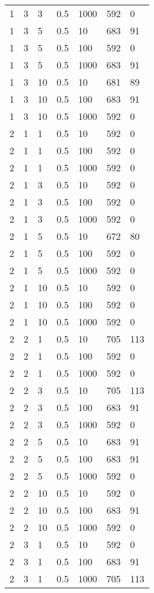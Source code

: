 \begin{longtable}{ | l | l | l | l | l | l | l |}
	1 & 3 & 3 & 0.5 & 1000 & 592 & 0 \\ 
	1 & 3 & 5 & 0.5 & 10 & 683 & 91 \\ 
	1 & 3 & 5 & 0.5 & 100 & 592 & 0 \\ 
	1 & 3 & 5 & 0.5 & 1000 & 683 & 91 \\ 
	1 & 3 & 10 & 0.5 & 10 & 681 & 89 \\ 
	1 & 3 & 10 & 0.5 & 100 & 683 & 91 \\ 
	1 & 3 & 10 & 0.5 & 1000 & 592 & 0 \\ 
	2 & 1 & 1 & 0.5 & 10 & 592 & 0 \\ 
	2 & 1 & 1 & 0.5 & 100 & 592 & 0 \\ 
	2 & 1 & 1 & 0.5 & 1000 & 592 & 0 \\ 
	2 & 1 & 3 & 0.5 & 10 & 592 & 0 \\ 
	2 & 1 & 3 & 0.5 & 100 & 592 & 0 \\ 
	2 & 1 & 3 & 0.5 & 1000 & 592 & 0 \\ 
	2 & 1 & 5 & 0.5 & 10 & 672 & 80 \\ 
	2 & 1 & 5 & 0.5 & 100 & 592 & 0 \\ 
	2 & 1 & 5 & 0.5 & 1000 & 592 & 0 \\ 
	2 & 1 & 10 & 0.5 & 10 & 592 & 0 \\ 
	2 & 1 & 10 & 0.5 & 100 & 592 & 0 \\ 
	2 & 1 & 10 & 0.5 & 1000 & 592 & 0 \\ 
	2 & 2 & 1 & 0.5 & 10 & 705 & 113 \\ 
	2 & 2 & 1 & 0.5 & 100 & 592 & 0 \\ 
	2 & 2 & 1 & 0.5 & 1000 & 592 & 0 \\ 
	2 & 2 & 3 & 0.5 & 10 & 705 & 113 \\ 
	2 & 2 & 3 & 0.5 & 100 & 683 & 91 \\ 
	2 & 2 & 3 & 0.5 & 1000 & 592 & 0 \\ 
	2 & 2 & 5 & 0.5 & 10 & 683 & 91 \\ 
	2 & 2 & 5 & 0.5 & 100 & 683 & 91 \\ 
	2 & 2 & 5 & 0.5 & 1000 & 592 & 0 \\ 
	2 & 2 & 10 & 0.5 & 10 & 592 & 0 \\ 
	2 & 2 & 10 & 0.5 & 100 & 683 & 91 \\ 
	2 & 2 & 10 & 0.5 & 1000 & 592 & 0 \\ 
	2 & 3 & 1 & 0.5 & 10 & 592 & 0 \\ 
	2 & 3 & 1 & 0.5 & 100 & 683 & 91 \\ 
	2 & 3 & 1 & 0.5 & 1000 & 705 & 113 \\ 

\end{longtable}
